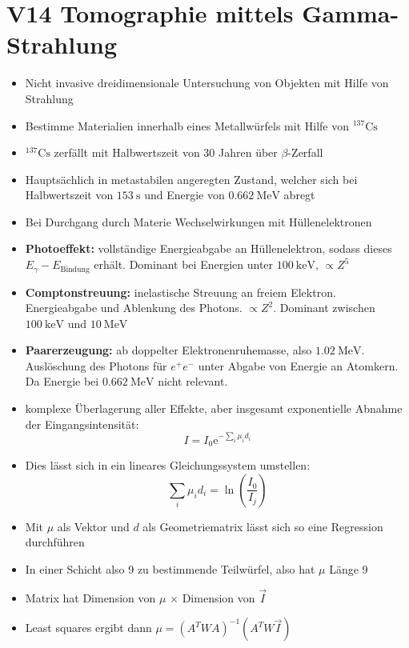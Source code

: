 \section{V14 Tomographie mittels Gamma-Strahlung}
\label{sec:V14}

\begin{itemize}
    \item Nicht invasive dreidimensionale Untersuchung von Objekten mit Hilfe von Strahlung
    \item Bestimme Materialien innerhalb eines Metallwürfels mit Hilfe von $^{137}\text{Cs}$
    \item $^{137}\text{Cs}$ zerfällt mit Halbwertszeit von 30 Jahren über $\beta$-Zerfall
    \item Hauptsächlich in metastabilen angeregten Zustand, welcher sich bei Halbwertszeit von $\SI{153}{\second}$ und Energie von $\SI{0,662}{\mega\electronvolt}$ abregt
    \item Bei Durchgang durch Materie Wechselwirkungen mit Hüllenelektronen
    \item \textbf{Photoeffekt:} vollständige Energieabgabe an Hüllenelektron, sodass dieses $E_\gamma - E_\text{Bindung}$ erhält. Dominant bei Energien unter $\SI{100}{\kilo\electronvolt}$, $\propto Z^5$
    \item \textbf{Comptonstreuung:} inelastische Streuung an freiem Elektron. Energieabgabe und Ablenkung des Photons. $\propto Z^2$. Dominant zwischen $\SI{100}{\kilo\electronvolt}$ und $\SI{10}{\mega\electronvolt}$
    \item \textbf{Paarerzeugung:} ab doppelter Elektronenruhemasse, also $\SI{1,02}{\mega\electronvolt}$. Auslöschung des Photons für $e^+e^-$ unter Abgabe von Energie an Atomkern. Da Energie bei $\SI{0.662}{\mega\electronvolt}$ nicht relevant.
    \item komplexe Überlagerung aller Effekte, aber insgesamt exponentielle Abnahme der Eingangsintensität:
        \begin{equation}
            I = I_0\text{e}^{-\sum\limits_{i}\mu_id_i}
        \end{equation}
    \item Dies lässt sich in ein lineares Gleichungssystem umstellen:
        \begin{equation}
            \sum\limits_{i}\mu_id_i = \ln\left(\frac{I_0}{I_j}\right)
        \end{equation}
    \item Mit $\mu$ als Vektor und $d$ als Geometriematrix lässt sich so eine Regression durchführen
    \item In einer Schicht also 9 zu bestimmende Teilwürfel, also hat $\mu$ Länge 9
    \item Matrix hat Dimension von $\mu$ $\times$ Dimension von $\vec{I}$
    \item Least squares ergibt dann $\mu = (A^TWA)^{-1}(A^TW\vec{I})$
\end{itemize}

